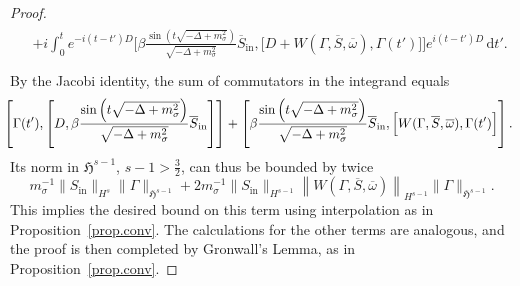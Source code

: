 \documentclass[AHL,Unicode,longabstracts,published]{cedram}
\newcommand{\rmin}{\mathrm{in}}
\newcommand{\gH}{\mathfrak{H}}
\renewcommand\d[1]{{\ensuremath{\,\text{d}#1}}}
\begin{document}
\begin{proof}
\begin{multline*}
\begin{aligned}
&+ i\int_0^t e^{-i(t-t')D}\Big[\beta \frac{\sin\left(t\sqrt{-\Delta + m^2_\sigma}\right)}{\sqrt{-\Delta + m^2_\sigma}}\overline{S}_\rmin, \Big[D+W\left(\Gamma, \overline{S}, \overline{\omega}\right),\Gamma(t')\Big]\Big]e^{i(t-t')D}\d t'. \\
\end{aligned}
\end{multline*}
By the Jacobi identity, the sum of commutators in the integrand equals
\begin{equation*}
\mkern-10mu\left[\Gamma(t'), \left[D,\beta \frac{\sin\left(t\sqrt{-\Delta + m^2_\sigma}\right)}{\sqrt{-\Delta + m^2_\sigma}}\overline{S}_\rmin\right]\right] + \left[\beta \frac{\sin\left(t\sqrt{-\Delta + m^2_\sigma}\right)}{\sqrt{-\Delta + m^2_\sigma}}\overline{S}_\rmin, \Big[W(\Gamma, \overline{S}, \overline{\omega}),\Gamma(t')\Big]\right].
\end{equation*}
Its norm in $\gH^{s-1}$, $s-1>\tfrac32$, can thus be bounded by twice
\begin{equation*}
m_\sigma^{-1}\|S_\rmin\|_{H^s} \|\Gamma \|_{\gH^{s-1}} + 2m_\sigma^{-1}\|S_\rmin\|_{H^{s-1}} \left\|W(\Gamma, \overline{S}, \overline{\omega})\right\|_{H^{s-1}} \|\Gamma \|_{\gH^{s-1}}.
\end{equation*}
This implies the desired bound on this term using interpolation as in Proposition~\ref{prop.conv}. The calculations for the other terms are analogous, and the proof is then completed by Gronwall's Lemma, as in Proposition~\ref{prop.conv}.
\end{proof}
\end{document}
